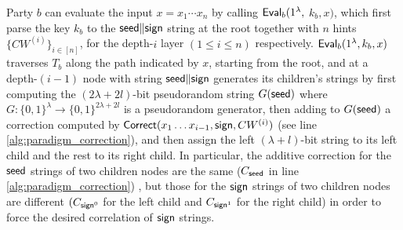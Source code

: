 Party $b$ can evaluate the input $x=x_1\cdots x_n$ by calling ${\sf Eval}_b(1^\lambda,$ $k_b,x)$, which first parse the key $k_b$ to the ${\sf seed}\|{\sf sign}$ string at the root together with $n$ hints $\{CW^{(i)}\}_{i\in[n]}$, for the depth-$i$ layer $(1\le i\le n)$ respectively. ${\sf Eval}_b(1^\lambda, k_b,x)$ traverses $T_b$ along the path indicated by $x$, starting from the root, and at a depth-$(i-1)$ node with string ${\sf seed}\|{\sf sign}$ generates its children's strings by first computing the $(2\lambda+2l)$-bit pseudorandom string $G({\sf seed})$ where $G:\{0,1\}^\lambda\rightarrow \{0,1\}^{2\lambda+2l}$ is a pseudorandom generator, then adding to $G({\sf seed})$ a correction computed by ${\sf Correct}(x_1\dots x_{i-1}, {\sf sign}, CW^{(i)})$ (see line \ref{alg:paradigm_correction}), and then assign the left $(\lambda+l)$-bit string to its left child and the rest to its right child. In particular, the additive correction for the ${\sf seed}$ strings of two children nodes are the same ($C_{\sf seed}$ in line \ref{alg:paradigm_correction}) , but those for the ${\sf sign}$ strings of two children nodes are different $(C_{{\sf sign}^0}$ for the left child and $C_{{\sf sign}^1}$ for the right child) in order to force the desired correlation of ${\sf sign}$ strings. 

